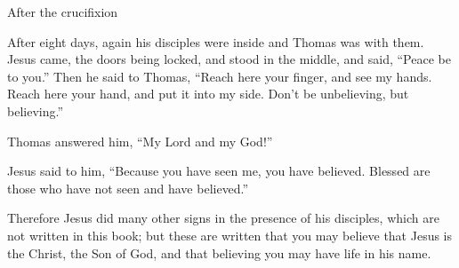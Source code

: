 \documentclass[10pt,twoside]{book}
\begin{document}
\begin{section}{After the crucifixion}
{  After eight days, again his disciples were inside and Thomas was with them. Jesus came, the doors being locked, and stood in the middle, and said, ``Peace be to you.''   Then he said to Thomas, ``Reach here your finger, and see my hands. Reach here your hand, and put it into my side. Don't be unbelieving, but believing.''

  Thomas answered him, ``My Lord and my God!''

  Jesus said to him, ``Because you have seen me, you have believed. Blessed are those who have not seen and have believed.''

  Therefore Jesus did many other signs in the presence of his disciples, which are not written in this book;   but these are written that you may believe that Jesus is the Christ, the Son of God, and that believing you may have life in his name. 
}

\end{section}

\end{document}
